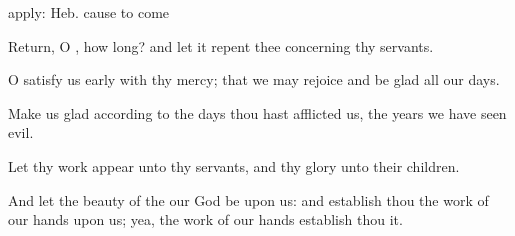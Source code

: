 {{apply: Heb. cause to come}
\par }{\Q {}Return, O
{}, how long? and let it
repent thee concerning thy
servants.
\par }{\Q {}O
satisfy us
early with thy
mercy; that we may
rejoice and be
glad all our
days.
\par }{\Q {}Make us
glad according to the
days
{} thou hast
afflicted us,
{} the
years
{} we have
seen
evil.
\par }{\Q {}Let thy
work
appear unto thy
servants, and thy
glory unto their
children.
\par }{\Q {}And let the
beauty of the
{} our
God be upon us: and
establish thou the
work of our
hands upon us; yea, the
work of our
hands
establish thou it.

}
